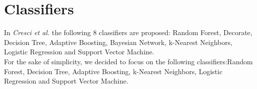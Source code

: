 \documentclass[a4paper,11pt]{article}
\begin{document}
\section{Classifiers}
In \textit{Cresci et al.} the following 8 classifiers are proposed: Random Forest, Decorate, Decision Tree, Adaptive Boosting, Bayesian Network, k-Nearest Neighbors, Logistic Regression and Support Vector Machine.\\

For the sake of simplicity, we decided to focus on the following classifiers:Random Forest,  Decision Tree, Adaptive Boosting, k-Nearest Neighbors, Logistic Regression and Support Vector Machine.\\



\end{document}
